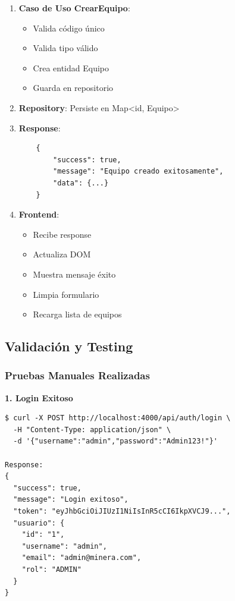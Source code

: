 \documentclass[12pt,a4paper]{article}
\begin{document}
\begin{enumerate}[leftmargin=*]
    \item \textbf{Caso de Uso CrearEquipo}:
    \begin{itemize}
        \item Valida código único
        \item Valida tipo válido
        \item Crea entidad Equipo
        \item Guarda en repositorio
    \end{itemize}

    \item \textbf{Repository}: Persiste en Map<id, Equipo>

    \item \textbf{Response}:
    \begin{verbatim}
    {
        "success": true,
        "message": "Equipo creado exitosamente",
        "data": {...}
    }
    \end{verbatim}

    \item \textbf{Frontend}:
    \begin{itemize}
        \item Recibe response
        \item Actualiza DOM
        \item Muestra mensaje éxito
        \item Limpia formulario
        \item Recarga lista de equipos
    \end{itemize}
\end{enumerate}

\subsection{Validación y Testing}

\subsubsection{Pruebas Manuales Realizadas}

\textbf{1. Login Exitoso}
\begin{verbatim}
$ curl -X POST http://localhost:4000/api/auth/login \
  -H "Content-Type: application/json" \
  -d '{"username":"admin","password":"Admin123!"}'

Response:
{
  "success": true,
  "message": "Login exitoso",
  "token": "eyJhbGciOiJIUzI1NiIsInR5cCI6IkpXVCJ9...",
  "usuario": {
    "id": "1",
    "username": "admin",
    "email": "admin@minera.com",
    "rol": "ADMIN"
  }
}
\end{verbatim}
\end{document}
